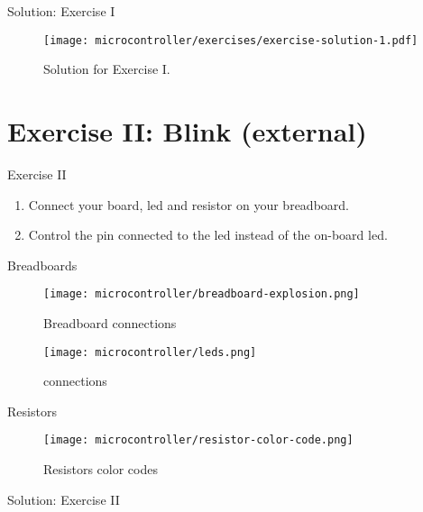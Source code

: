 \documentclass[aspectratio=169]{beamer}
\begin{document}
\begin{frame}{Solution: Exercise I}
    \begin{figure}
        \texttt{[image: microcontroller/exercises/exercise-solution-1.pdf]}
        \caption{Solution for Exercise I.}
    \end{figure}
\end{frame}

\section{Exercise II: Blink  (external)}

\begin{frame}
    \begin{exampleblock}{Exercise II}
        \begin{enumerate}
            \item Connect your board, \acs{led} and resistor on your breadboard.
            \item Control the pin connected to the \acs{led} instead of the on-board \acs{led}.
        \end{enumerate}
    \end{exampleblock}
\end{frame}

\begin{frame}{Breadboards}
    \begin{figure}
        \texttt{[image: microcontroller/breadboard-explosion.png]}
        \caption{Breadboard connections}
    \end{figure}
\end{frame}

\begin{frame}{}
    \begin{figure}
        \texttt{[image: microcontroller/leds.png]}
        \caption{ connections}
    \end{figure}
\end{frame}

\begin{frame}{Resistors}
    \begin{figure}
        \texttt{[image: microcontroller/resistor-color-code.png]}
        \caption{Resistors color codes}
    \end{figure}
\end{frame}

\begin{frame}{Solution: Exercise II}
    \begin{listing}[H]
        \caption{Solution for Exercise II.}
        \label{lst:arduino:exercise:2:solution}
    \end{listing}
\end{frame}
\end{document}
